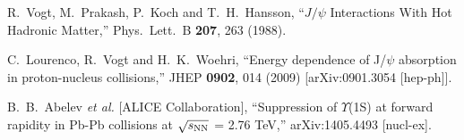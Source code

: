 \documentclass[aps,prc,preprint,superscriptaddress,showpacs,showkeys]{revtex4-1}
\begin{document}
\begin{thebibliography}{100}

  R.~Vogt, M.~Prakash, P.~Koch and T.~H.~Hansson,
  ``$J/\psi$ Interactions With Hot Hadronic Matter,''
  Phys.\ Lett.\ B {\bf 207}, 263 (1988).
 

  C.~Lourenco, R.~Vogt and H.~K.~Woehri,
  ``Energy dependence of J/$\psi$ absorption in proton-nucleus collisions,''
  JHEP {\bf 0902}, 014 (2009)
  [arXiv:0901.3054 [hep-ph]].

  B.~B.~Abelev {\it et al.}  [ALICE Collaboration],
  ``Suppression of $\Upsilon$(1S) at forward rapidity in Pb-Pb collisions at $\sqrt{s_{\rm NN}}$ = 2.76 TeV,''
  arXiv:1405.4493 [nucl-ex].


\end{thebibliography}
\end{document}
